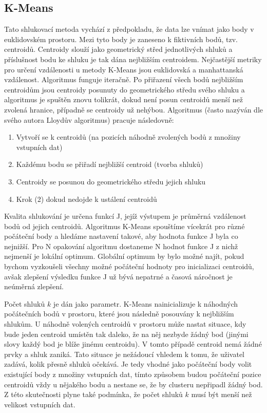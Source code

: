 \documentclass[pdftex,a4paper]{article}
\begin{document}
\subsection{K-Means}
Tato shlukovací metoda vychází z předpokladu, že data lze vnímat jako body v euklidovském prostoru. Mezi tyto body je zaneseno k fiktivních bodů, tzv. centroidů. Centroidy slouží jako geometrický střed jednotlivých shluků a příslušnost bodu ke shluku je tak dána nejbližším centroidem. Nejčastější metriky pro určení vzdálenosti u metody K-Means jsou euklidovská a manhattanská vzdálenost. Algoritmus funguje iteračně. Po přiřazení všech bodů nejbližším centroidům jsou centroidy posunuty do geometrického středu svého shluku a algoritmus je spuštěn znovu tolikrát, dokud není posun centroidů menší než zvolená hranice, případně se centroidy už nehýbou. Algoritmus (často nazýván dle svého autora Lloydův algoritmus) pracuje následovně:

\begin{enumerate}
	\item Vytvoří se k centroidů (na pozicích náhodně zvolených bodů z množiny vstupních dat)
	\item Každému bodu se přiřadí nejbližší centroid (tvorba shluků)
	\item Centroidy se posunou do geometrického středu jejich shluku
	\item Krok (2) dokud nedojde k ustálení centroidů
\end{enumerate}

Kvalita shlukování je určena funkcí J, jejíž výstupem je průměrná vzdálenost bodů od jejich centroidů. Algoritmus K-Means spouštíme vícekrát pro různé počáteční body a hledáme nastavení takové, aby hodnota funkce J byla co nejnižší. Pro N opakování algoritmu dostaneme N hodnot funkce J z nichž nejmenší je lokální optimum. Globální optimum by bylo možné najít, pokud bychom vyzkoušeli všechny možné počáteční hodnoty pro inicializaci centroidů, avšak zlepšení výsledku funkce J už bývá nepatrné a časová náročnost je neúměrná zlepšení.

Počet shluků $k$ je dán jako parametr. K-Means nainicializuje k náhodných počátečních bodů v prostoru, které jsou následně posouvány k nejbližším shlukům. U náhodně volených centroidů v prostoru může nastat situace, kdy bude jeden centroid umístěn tak daleko, že na něj nezbyde žádný bod (jinými slovy každý bod je blíže jinému centroidu). V tomto případě centroid nemá žádné prvky a shluk zaniká. Tato situace je nežádoucí vhledem k tomu, že uživatel zadává, kolik přesně shluků očekává. Je tedy vhodné jako počáteční body volit existující body z množiny vstupních dat, tímto způsobem budou počáteční pozice centroidů vždy u nějakého bodu a nestane se, že by clusteru nepřipadl žádný bod. Z této skutečnosti plyne také podmínka, že počet shluků $k$ musí být menší než velikost vstupních dat.
\end{document}

